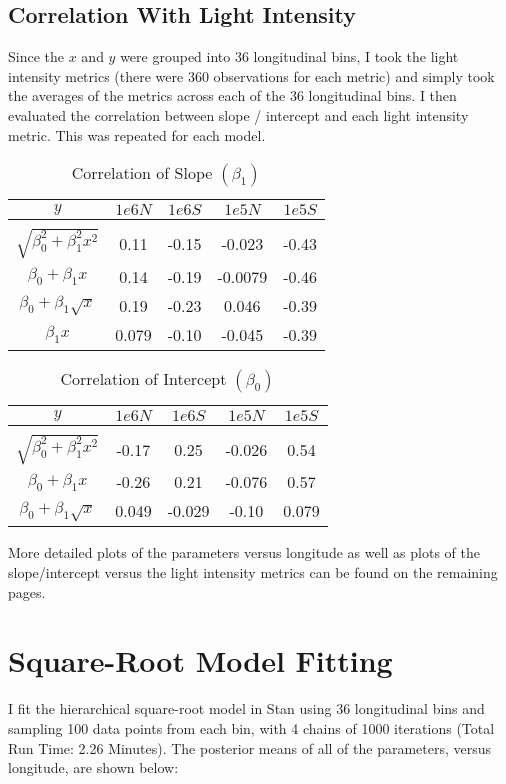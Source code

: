 \documentclass[12pt]{article}
\begin{document}
\subsection{Correlation With Light Intensity}
Since the $x$ and $y$ were grouped into 36 longitudinal bins, I took the light intensity metrics (there were 360 observations for each metric) and simply took the averages of the metrics across each of the 36 longitudinal bins. I then evaluated the correlation between slope / intercept and each light intensity metric. This was repeated for each model.
\begin{table}[ht]
\caption{Correlation of Slope $(\beta_1)$}
\centering
\begin{tabular}{c c c c c }
\hline\hline
$y$ & $1e6 N$ & $1e6 S$ & $1e5 N$ & $1e5 S$\\ [0.5ex] %
\hline \\
$\sqrt{\beta_0^2+\beta_1^2x^2}$ & 0.11 & -0.15 & -0.023 &  -0.43 \\
$\beta_0+\beta_1x$ & 0.14 & -0.19 & -0.0079 & -0.46 \\
$\beta_0+\beta_1\sqrt{x}$ & 0.19 & -0.23 & 0.046 & -0.39\\
$\beta_1x$ & 0.079 & -0.10 & -0.045 & -0.39 \\ 
\hline
\end{tabular}
\label{table:nonlin}
\end{table}

\begin{table}[ht]
\caption{Correlation of Intercept $(\beta_0)$}
\centering
\begin{tabular}{c c c c c }
\hline\hline
$y$ & $1e6 N$ & $1e6 S$ & $1e5 N$ & $1e5 S$\\ [0.5ex] %
\hline \\
$\sqrt{\beta_0^2+\beta_1^2x^2}$ & -0.17 & 0.25 & -0.026 &  0.54 \\
$\beta_0+\beta_1x$ & -0.26 & 0.21 & -0.076 & 0.57 \\
$\beta_0+\beta_1\sqrt{x}$ & 0.049 & -0.029 & -0.10 & 0.079\\
\hline
\end{tabular}
\label{table:nonlin}
\end{table}

\noindent More detailed plots of the parameters versus longitude as well as plots of the slope/intercept versus the light intensity metrics can be found on the remaining pages. 

\pagebreak
\section{Square-Root Model Fitting}
I fit the hierarchical square-root model in Stan using 36 longitudinal bins and sampling 100 data points from each bin, with 4 chains of 1000 iterations (Total Run Time: 2.26 Minutes).  The posterior means of all of the parameters, versus longitude, are shown below:
\end{document}
